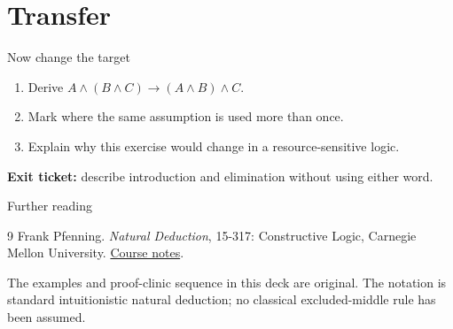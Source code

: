 \documentclass[12pt,aspectratio=43]{beamer}
\begin{document}
\section{Transfer}
\begin{frame}{Now change the target}
\begin{enumerate}[<+->]
\item Derive $A\land(B\land C)\to (A\land B)\land C$.
\item Mark where the same assumption is used more than once.
\item Explain why this exercise would change in a resource-sensitive logic.
\end{enumerate}
\bigskip
\textbf{Exit ticket:} describe introduction and elimination without using either word.
\end{frame}
\begin{frame}{Further reading}
\small
\begin{thebibliography}{9}
 Frank Pfenning. \emph{Natural Deduction}, 15-317: Constructive Logic, Carnegie Mellon University.
\href{https://www.cs.cmu.edu/~fp/courses/15317-f17/lectures/02-natded.pdf}{Course notes}.
\end{thebibliography}
The examples and proof-clinic sequence in this deck are original. The notation is standard intuitionistic natural deduction; no classical excluded-middle rule has been assumed.
\end{frame}
\end{document}
